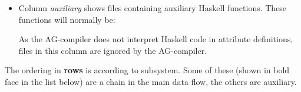 \begin{itemize}
\item
Column {\em auxiliary}
shows files containing auxiliary Haskell functions.
These functions will normally be:
As the AG-compiler does not interpret Haskell code in attribute definitions,
files in this column are ignored by the AG-compiler.

\end{itemize}

\newpage
The ordering in {\bf rows} is according to subsystem.
Some of these (shown in bold face in the list below) are 
a chain in the main data flow, the others are auxiliary.
